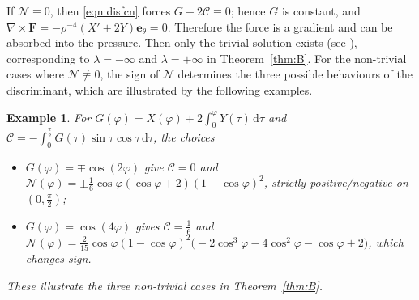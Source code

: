 \documentclass{amsart}
\newtheorem{example}{Example}[section]
\newcommand{\Be}{{\boldsymbol{e}}}
\newcommand{\BF}{{\boldsymbol{F}}}
\newcommand{\R}{\mathbb{R}}
\newcommand{\mcC}{\mathcal{C}}
\begin{document}
If $\mathcal{N}\equiv0$, then \eqref{eqn:disfcn} forces $G+2\mathcal{C}\equiv0$; hence $G$ is constant, and
$\nabla\times\BF = -\rho^{-4}(X'+2Y)\Be_\theta = 0$. Therefore the force is a gradient and can be absorbed into the pressure. Then only the trivial solution exists (see \cite[Theorem 5.1]{KMT18}), corresponding to $\underline{\lambda}=-\infty$ and $\overline{\lambda}=+\infty$ in Theorem~\ref{thm:B}. For the non-trivial cases where $\mathcal{N}\not\equiv0$, the sign of $\mathcal{N}$ determines the three possible behaviours of the discriminant, which are illustrated by the following examples.


\begin{example}\label{example:N}
For $G(\varphi)=X(\varphi)+2\int_0^\varphi Y(\tau)\,\mathrm{d}\tau$ and $\mcC=-\int_0^{\frac{\pi}{2}} G(\tau)\sin\tau\cos\tau\,\mathrm{d}\tau$, the choices
\begin{itemize}
\item $G(\varphi)=\mp\cos(2\varphi)$ give $\mcC=0$ and
  $\mathcal{N}(\varphi)=\pm\frac{1}{6}\cos\varphi(\cos\varphi+2)(1-\cos\varphi)^2$, strictly positive/negative on $(0,\tfrac{\pi}{2})$;
\item $G(\varphi)=\cos(4\varphi)$ gives $\mcC=\frac16$ and
  $\mathcal{N}(\varphi)=\frac{2}{15}\cos\varphi(1-\cos\varphi)^2\bigl(-2\cos^3\varphi-4\cos^2\varphi-\cos\varphi+2\bigr)$, which changes sign.
\end{itemize}
These illustrate the three non-trivial cases in Theorem~\ref{thm:B}.
\end{example}


\end{document}
